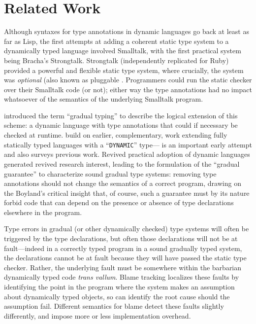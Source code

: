 
\section{Related Work}
\label{sec:related-work}

Although syntaxes for type annotations in dynamic languages go back at
least as far as Lisp\citep{cltl2}, the first attempts at adding a
coherent static type system to a dynamically typed language involved
Smalltalk\citep{RalphJohnson1986}, with the first practical system
being Bracha's Strongtalk\citep{strongtalk}. Strongtalk
(independently replicated for Ruby\citep{DBRuby09}) provided a
powerful and flexible static type system, where crucially, the system
was \emph{optional} (also known as pluggable
\cite{GiladPluggable2004}. Programmers could run the static checker
over their Smalltalk code (or not); either way the type annotations
had no impact whatsoever of the semantics of the underlying Smalltalk
program.

\citet{Siek2006} introduced the term ``gradual typing''
 to describe the logical extension of this scheme: a
dynamic language with type annotations that could if necessary be
checked at runtime. \citeauthor{Siek2006} build on earlier, complementary,
work extending fully statically typed languages with a ``\texttt{DYNAMIC}''
type---\citet{AbadiTOPLAS1991} is an
important early attempt
and also surveys previous work. Revived practical adoption of dynamic
languages generated revived research interest, leading to the
formulation of the ``gradual guarantee''\citep{Siek2006,Siek2015} to characterize sound
gradual type systems: removing type annotations should not change the
semantics of a correct program, drawing on the Boyland's critical
insight that, of course, such a guarantee must by its nature forbid
code that can depend on the presence or absence of type declarations 
elsewhere in the program\citep{Boyland2014}. 

Type errors in gradual (or other dynamically checked) type systems will
often be triggered by the type declarations, but often those
declarations will not be at fault---indeed in a correctly typed
program in a sound gradually typed system,  the declarations cannot be
at fault because they will have passed the static type
checker. Rather, the underlying fault must be somewhere within the
barbarian dynamically typed code \emph{trans vallum}.
Blame tracking\citep{blame2009,blameThreesomes2010,blameForAll2011} localizes these
faults by identifying 
the point in the program where the system makes an 
assumption about dynamically typed objects, so can identify the root
cause should the assumption fail.  Different semantics for blame
detect these faults slightly differently, and impose more or less
implementation overhead\citep{reticPython2014,monotonic2015,Vitousek2017}.

